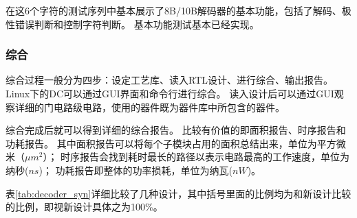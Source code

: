 \documentclass[UTF8]{ctexart}
\begin{document}
在这6个字符的测试序列中基本展示了8B/10B解码器的基本功能，包括了解码、极性错误判断和控制字符判断。
基本功能测试基本已经实现。

\subsubsection{综合}

综合过程一般分为四步：设定工艺库、读入RTL设计、进行综合、输出报告。
Linux下的DC可以通过GUI界面和命令行进行综合。
读入设计后可以通过GUI观察详细的门电路级电路，使用的器件既为器件库中所包含的器件。

综合完成后就可以得到详细的综合报告。
比较有价值的即面积报告、时序报告和功耗报告。
其中面积报告可以将每个子模块占用的面积总结出来，单位为平方微米（$\mu m^2$）；
时序报告会找到耗时最长的路径以表示电路最高的工作速度，单位为纳秒($ns$)；
功耗报告即整体的功率损耗，单位为纳瓦($nW$)。

表\ref{tab:decoder_syn}详细比较了几种设计，其中括号里面的比例均为和新设计比较的比例，即视新设计具体之为100\%。
\end{document}
